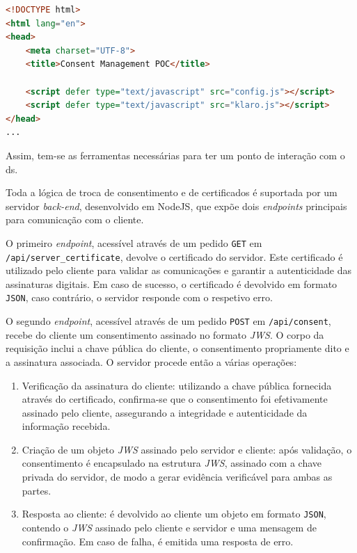 \begin{lstlisting}[language=HTML, caption={Integração do \textit{klaro.js} com a configuração local}, label={lst:klaro-integration}]
<!DOCTYPE html>
<html lang="en">
<head>
    <meta charset="UTF-8">
    <title>Consent Management POC</title>

    <script defer type="text/javascript" src="config.js"></script>
    <script defer type="text/javascript" src="klaro.js"></script>
</head>
...
\end{lstlisting}

Assim, tem-se as ferramentas necessárias para ter um ponto de interação com o \acrshort{ds}.

Toda a lógica de troca de consentimento e de certificados é suportada por um servidor \textit{back-end}, desenvolvido em NodeJS, que expõe dois \textit{endpoints} principais para comunicação com o cliente.

O primeiro \textit{endpoint}, acessível através de um pedido \texttt{GET} em \texttt{/api/server\_certificate}, devolve o certificado do servidor. Este certificado é utilizado pelo cliente para validar as comunicações e garantir a autenticidade das assinaturas digitais. Em caso de sucesso, o certificado é devolvido em formato \texttt{JSON}, caso contrário, o servidor responde com o respetivo erro.

O segundo \textit{endpoint}, acessível através de um pedido \texttt{POST} em \texttt{/api/consent}, recebe do cliente um consentimento assinado no formato \textit{JWS}. O corpo da requisição inclui a chave pública do cliente, o consentimento propriamente dito e a assinatura associada. O servidor procede então a várias operações:

\begin{enumerate}
    \item Verificação da assinatura do cliente: utilizando a chave pública fornecida através do certificado, confirma-se que o consentimento foi efetivamente assinado pelo cliente, assegurando a integridade e autenticidade da informação recebida.
    \item Criação de um objeto \textit{JWS} assinado pelo servidor e cliente: após validação, o consentimento é encapsulado na estrutura \textit{JWS}, assinado com a chave privada do servidor, de modo a gerar evidência verificável para ambas as partes.
    \item Resposta ao cliente: é devolvido ao cliente um objeto em formato \texttt{JSON}, contendo o \textit{JWS} assinado pelo cliente e servidor e uma mensagem de confirmação. Em caso de falha, é emitida uma resposta de erro.
\end{enumerate}

